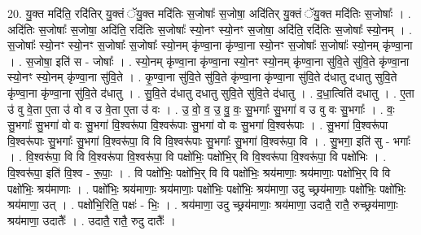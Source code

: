 \documentclass[17pt]{extarticle}
\begin{document}
20. यु॒क्त मदि॑ति॒ रदि॑तिर् यु॒क्तं ॅयु॒क्त मदि॑तिः स॒जोषाः᳚ स॒जोषा॒ अदि॑तिर् यु॒क्तं ॅयु॒क्त मदि॑तिः स॒जोषाः᳚ । . अदि॑तिः स॒जोषाः᳚ स॒जोषा॒ अदि॑ति॒ रदि॑तिः स॒जोषाः᳚ स्यो॒नꣳ स्यो॒नꣳ स॒जोषा॒ अदि॑ति॒ रदि॑तिः स॒जोषाः᳚ स्यो॒नम् । . स॒जोषाः᳚ स्यो॒नꣳ स्यो॒नꣳ स॒जोषाः᳚ स॒जोषाः᳚ स्यो॒नम् कृ॑ण्वा॒ना कृ॑ण्वा॒ना स्यो॒नꣳ स॒जोषाः᳚ स॒जोषाः᳚ स्यो॒नम् कृ॑ण्वा॒ना । . स॒जोषा॒ इति॑ स - जोषाः᳚ । . स्यो॒नम् कृ॑ण्वा॒ना कृ॑ण्वा॒ना स्यो॒नꣳ स्यो॒नम् कृ॑ण्वा॒ना सु॑वि॒ते सु॑वि॒ते कृ॑ण्वा॒ना स्यो॒नꣳ स्यो॒नम् कृ॑ण्वा॒ना सु॑वि॒ते । . कृ॒ण्वा॒ना सु॑वि॒ते सु॑वि॒ते कृ॑ण्वा॒ना कृ॑ण्वा॒ना सु॑वि॒ते द॑धातु दधातु सुवि॒ते कृ॑ण्वा॒ना कृ॑ण्वा॒ना सु॑वि॒ते द॑धातु । . सु॒वि॒ते द॑धातु दधातु सुवि॒ते सु॑वि॒ते द॑धातु । . द॒धा॒त्विति॑ दधातु । . ए॒ता उ॑ वु वे॒ता ए॒ता उ॑ वो व उ वे॒ता ए॒ता उ॑ वः । . उ॒ वो॒ व॒ उ॒ वु॒ वः॒ सु॒भगाः᳚ सु॒भगा॑ व उ वु वः सु॒भगाः᳚ । . वः॒ सु॒भगाः᳚ सु॒भगा॑ वो वः सु॒भगा॑ वि॒श्वरू॑पा वि॒श्वरू॑पाः सु॒भगा॑ वो वः सु॒भगा॑ वि॒श्वरू॑पाः । . सु॒भगा॑ वि॒श्वरू॑पा वि॒श्वरू॑पाः सु॒भगाः᳚ सु॒भगा॑ वि॒श्वरू॑पा॒ वि वि वि॒श्वरू॑पाः सु॒भगाः᳚ सु॒भगा॑ वि॒श्वरू॑पा॒ वि । . सु॒भगा॒ इति॑ सु - भगाः᳚ । . वि॒श्वरू॑पा॒ वि वि वि॒श्वरू॑पा वि॒श्वरू॑पा॒ वि पक्षो॑भिः॒ पक्षो॑भि॒र् वि वि॒श्वरू॑पा वि॒श्वरू॑पा॒ वि पक्षो॑भिः । . वि॒श्वरू॑पा॒ इति॑ वि॒श्व - रू॒पाः॒ । . वि पक्षो॑भिः॒ पक्षो॑भि॒र् वि वि पक्षो॑भिः॒ श्रय॑माणाः॒ श्रय॑माणाः॒ पक्षो॑भि॒र् वि वि पक्षो॑भिः॒ श्रय॑माणाः । . पक्षो॑भिः॒ श्रय॑माणाः॒ श्रय॑माणाः॒ पक्षो॑भिः॒ पक्षो॑भिः॒ श्रय॑माणा॒ उदु च्छ्रय॑माणाः॒ पक्षो॑भिः॒ पक्षो॑भिः॒ श्रय॑माणा॒ उत् । . पक्षो॑भि॒रिति॒ पक्षः॑ - भिः॒ । . श्रय॑माणा॒ उदु च्छ्रय॑माणाः॒ श्रय॑माणा॒ उदातै॒ रातै॒ रुच्छ्रय॑माणाः॒ श्रय॑माणा॒ उदातैः᳚ । . उदातै॒ रातै॒ रुदु दातैः᳚ । \newline
\end{document}
